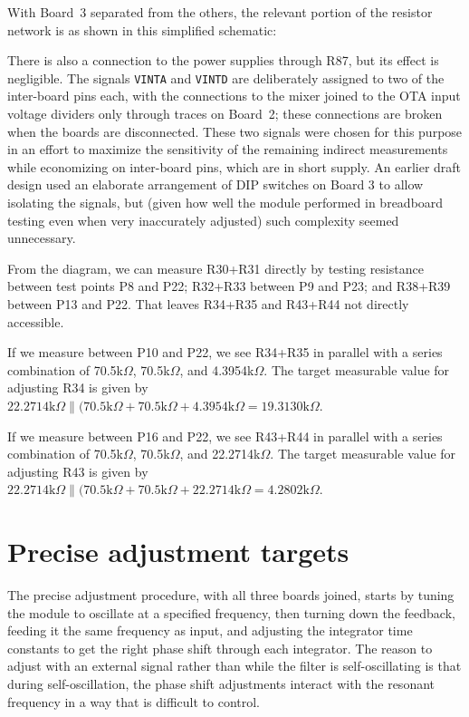 With Board~3 separated from the others, the relevant portion of the resistor
network is as shown in this simplified schematic:

{\centering\par}

There is also a connection
to the power supplies through R87, but its effect is negligible.  The
signals \texttt{VINTA} and \texttt{VINTD} are deliberately assigned to two
of the inter-board pins each, with the connections to the mixer joined to
the OTA input voltage dividers only through traces on Board~2; these
connections are broken when the boards are disconnected.  These two signals
were chosen for this purpose in an effort to maximize the sensitivity of the
remaining indirect measurements while economizing on inter-board pins, which
are in short supply.  An earlier draft design used an elaborate arrangement
of DIP switches on Board 3 to allow isolating the signals, but (given how
well the module performed in breadboard testing even when very inaccurately
adjusted) such complexity seemed unnecessary.

From the diagram, we can measure R30+R31 directly by testing resistance
between test points P8 and P22; R32+R33 between P9 and P23; and R38+R39
between P13 and P22.  That leaves R34+R35 and R43+R44 not directly
accessible.

If we measure between P10 and P22, we see R34+R35 in parallel with a series
combination of 70.5k$\Omega$, 70.5k$\Omega$, and 4.3954k$\Omega$.  The
target measurable value for adjusting R34 is given by $22.2714\textrm{k}\Omega\|(70.5\textrm{k}\Omega+
70.5\textrm{k}\Omega+4.3954\textrm{k}\Omega=19.3130\textrm{k}\Omega$.

If we measure between P16 and P22, we see R43+R44 in parallel with a series
combination of 70.5k$\Omega$, 70.5k$\Omega$, and 22.2714k$\Omega$.  The
target measurable value for adjusting R43 is given by
$22.2714\textrm{k}\Omega\|(70.5\textrm{k}\Omega+
70.5\textrm{k}\Omega+22.2714\textrm{k}\Omega=4.2802\textrm{k}\Omega$.

\section{Precise adjustment targets}

The precise adjustment procedure, with all three boards joined, starts by
tuning the module to oscillate at a specified frequency, then turning down
the feedback, feeding it the same frequency as input, and adjusting the
integrator time constants to get the right phase shift through each
integrator.  The reason to adjust with an external signal rather than while
the filter is self-oscillating is that during self-oscillation, the phase shift
adjustments interact with the resonant frequency in a way that is difficult
to control.

